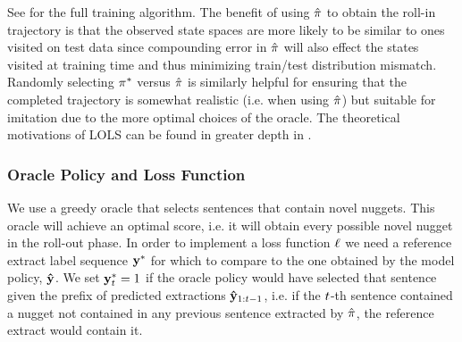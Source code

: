 %

See \cite{kedzie2016real} for the full training algorithm.
The benefit of using $\hat{\pi}$ to obtain the roll-in trajectory 
is that the observed state spaces are more likely to be similar to ones visited
on test data since compounding error in $\hat{\pi}$ will also effect the 
states visited at training 
time and thus minimizing train/test distribution mismatch. 
Randomly selecting $\pi^{*}$ versus $\hat{\pi}$ is similarly 
helpful for ensuring that the completed trajectory is somewhat realistic
(i.e. when using $\hat{\pi}$) but suitable for imitation due to the 
more optimal choices of the oracle.
The theoretical motivations of LOLS can be found
in greater depth in \cite{chang2015learning}.


\subsubsection{Oracle Policy and Loss Function}

We use a greedy oracle that selects sentences that contain novel
nuggets. This oracle will achieve an optimal \comp{} score, i.e.
it will obtain every possible novel nugget in the roll-out phase.
In order to implement a loss function $\ell$ we need a reference
extract label sequence $\mathbf{y}^*$ for which to compare to the one 
obtained by the model policy, $\mathbf{\hat{y}}$. We set 
$\mathbf{y}^*_t = 1$ if the oracle policy would have selected that
sentence given the prefix of predicted extractions $\mathbf{\hat{y}}_{1:t -1}$, i.e. if the $t$-th sentence contained a nugget not contained in
any previous sentence extracted by $\hat{\pi}$, the reference extract would
contain it.

